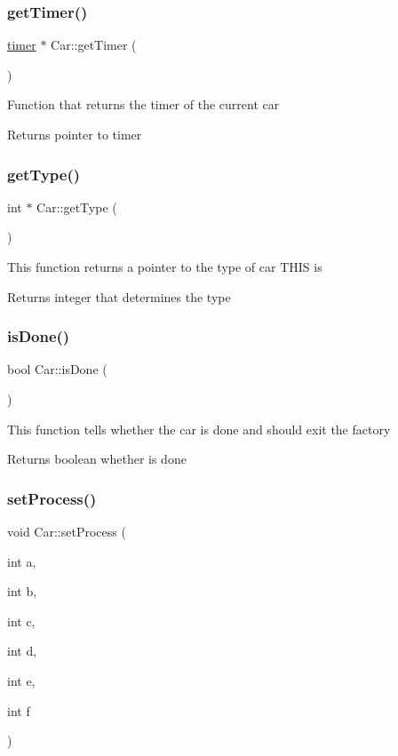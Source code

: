 \subsubsection{\texorpdfstring{getTimer()}{getTimer()}}
{\footnotesize\ttfamily \mbox{\hyperlink{classtimer}{timer}} $\ast$ Car\+::get\+Timer (\begin{DoxyParamCaption}{ }\end{DoxyParamCaption})}

Function that returns the timer of the current car \begin{DoxyReturn}{Returns}
pointer to timer 
\end{DoxyReturn}
\mbox{\label{class_car_a0ce6ed79b6d381a497edf7ddff6192d5}} 
\subsubsection{\texorpdfstring{getType()}{getType()}}
{\footnotesize\ttfamily int $\ast$ Car\+::get\+Type (\begin{DoxyParamCaption}{ }\end{DoxyParamCaption})}

This function returns a pointer to the type of car T\+H\+IS is \begin{DoxyReturn}{Returns}
integer that determines the type 
\end{DoxyReturn}
\mbox{\label{class_car_a63876f3d899700e7ba60f51d71a85b23}} 
\subsubsection{\texorpdfstring{isDone()}{isDone()}}
{\footnotesize\ttfamily bool Car\+::is\+Done (\begin{DoxyParamCaption}{ }\end{DoxyParamCaption})}

This function tells whether the car is done and should exit the factory \begin{DoxyReturn}{Returns}
boolean whether is done 
\end{DoxyReturn}
\mbox{\label{class_car_a231f37919a88d434119f897efbebeaf3}} 
\subsubsection{\texorpdfstring{setProcess()}{setProcess()}}
{\footnotesize\ttfamily void Car\+::set\+Process (\begin{DoxyParamCaption}\item[{int}]{a,  }\item[{int}]{b,  }\item[{int}]{c,  }\item[{int}]{d,  }\item[{int}]{e,  }\item[{int}]{f }\end{DoxyParamCaption})}

